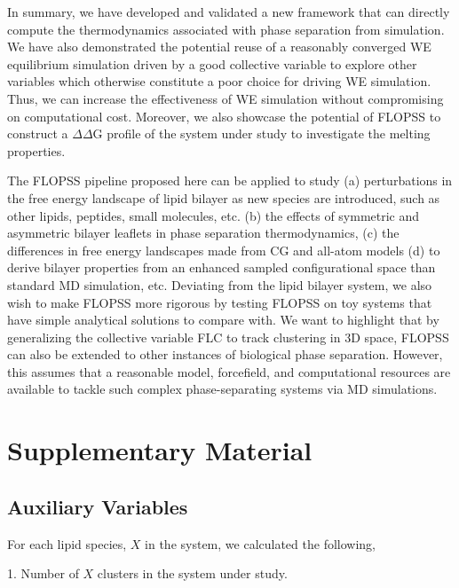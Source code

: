 \documentclass{biophys-new}
\begin{document}
In summary, we have developed and validated a new framework that can directly compute the thermodynamics associated with phase separation from simulation.
We have also demonstrated the potential reuse of a reasonably converged WE equilibrium simulation driven by a good collective variable to explore other variables which otherwise constitute a poor choice for driving WE simulation.
Thus, we can increase the effectiveness of WE simulation without compromising on computational cost.
Moreover, we also showcase the potential of FLOPSS to construct a $\Delta\Delta$G profile of the system under study to investigate the melting properties.

The FLOPSS pipeline proposed here can be applied to study (a) perturbations in the free energy landscape of lipid bilayer as new species are introduced, such as other lipids, peptides, small molecules, etc.
(b) the effects of symmetric and asymmetric bilayer leaflets in phase separation thermodynamics,
(c) the differences in free energy landscapes made from CG and all-atom models 
(d) to derive bilayer properties from an enhanced sampled configurational space than standard MD simulation, etc. 
Deviating from the lipid bilayer system, we also wish to make FLOPSS more rigorous by testing FLOPSS on toy systems that have simple analytical solutions to compare with. 
We want to highlight that by generalizing the collective variable FLC to track clustering in 3D space, FLOPSS can also be extended to other instances of biological phase separation.
However, this assumes that a reasonable model, forcefield, and computational resources are available to tackle such complex phase-separating systems via MD simulations.






\section*{Supplementary Material}

\subsection*{Auxiliary Variables}

For each lipid species, $X$ in the system, we calculated the following, 

1. Number of $X$ clusters in the system under study.
\end{document}
